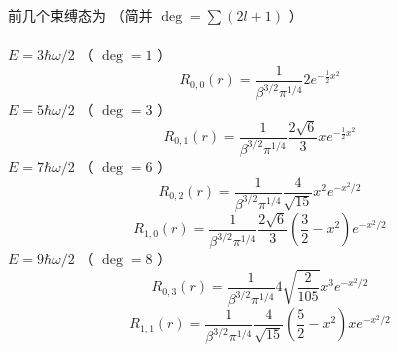 前几个束缚态为 （简并 $\deg  = \sum {(2l + 1)} $ ）\\ \\
 $E = 3\hbar \omega /2$ （ $\deg  = 1$ ）
\begin{equation}
{R_{0,0}}(r) = \frac{1}{{{\beta ^{3/2}}{\pi ^{1/4}}}}2{e^{ - \frac{1}{2}{x^2}}}
\end{equation}
 $E = 5\hbar \omega /2$ （ $\deg  = 3$ ）
\begin{equation}
{R_{0,1}}(r) = \frac{1}{{{\beta ^{3/2}}{\pi ^{1/4}}}}\frac{{2\sqrt 6 }}{3}x{e^{ - \frac{1}{2}{x^2}}}
\end{equation}
 $E = 7\hbar \omega /2$ （ $\deg  = 6$ ）
\begin{equation}
{R_{0,2}}(r) = \frac{1}{{{\beta ^{3/2}}{\pi ^{1/4}}}}\frac{4}{{\sqrt {15} }}{x^2}{e^{ - {x^2}/2}}
\end{equation}
\begin{equation}
{R_{1,0}}(r) = \frac{1}{{{\beta ^{3/2}}{\pi ^{1/4}}}}\frac{{2\sqrt 6 }}{3}\left( {\frac{3}{2} - {x^2}} \right){e^{ - {x^2}/2}}
\end{equation}
 $E = 9\hbar \omega /2$ （ $\deg  = 8$ ）
\begin{equation}
 {R_{0,3}}(r) = \frac{1}{{{\beta ^{3/2}}{\pi ^{1/4}}}}4\sqrt {\frac{2}{{105}}} {x^3}{e^{ - {x^2}/2}}
\end{equation}
\begin{equation}
{R_{1,1}}(r) = \frac{1}{{{\beta ^{3/2}}{\pi ^{1/4}}}}\frac{4}{{\sqrt {15} }}\left( {\frac{5}{2} - {x^2}} \right)x{e^{ - {x^2}/2}}
\end{equation}

 
